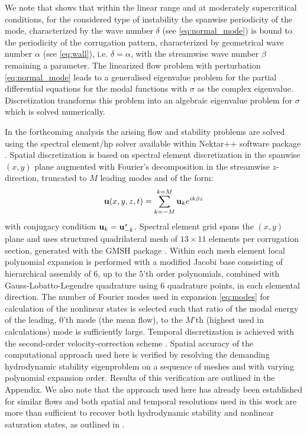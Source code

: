 \documentclass[lineno]{jfm}
\begin{document}
We note that \citet{Nikesh2017} shows that within the linear range and at moderately supercritical conditions, for the considered type of instability the spanwise
periodicity of the mode, characterized by the wave number $\delta$ (see \eqref{eq:normal_mode}) is bound to the periodicity of the corrugation pattern, characterized by geometrical wave number $\alpha$ (see \eqref{eq:wall}), i.e. $\delta=\alpha$, with the streamwise wave number $\beta$ remaining a parameter.
The linearized flow problem with perturbation \eqref{eq:normal_mode} leads to a generalised eigenvalue problem for the partial differential equations for the modal functions with $\sigma$ as the complex eigenvalue.
Discretization transforms this problem into an algebraic eigenvalue problem for $\sigma$
which is solved numerically.

In the forthcoming analysis the arising flow and stability problems are solved using the spectral element/hp solver available within Nektar++ software package \citep{Cantwell2015}.
Spatial discretization is based on spectral element discretization in the spanwise $(x,y)$ plane augmented with Fourier’s decomposition in the streamwise $z$-direction, truncated to $M$ leading modes and of the form:
\begin{equation}\label{eq:modes}
    \textbf{u}(x,y,z,t) =   \sum_{k=-M}^{k=M} {\bf u}_k e^{ik\beta z}
\end{equation}
with conjugacy condition {${\bf u}_k={\bf u}^*_{-k}$}.
Spectral element grid spans the $(x,y)$ plane and uses structured quadrilateral
mesh of $13\times11$ elements per corrugation section, generated with the GMSH package \citep{GMSH2009}.
Within each mesh element local polynomial expansion is performed with a modified Jacobi base \citep{Cantwell2011}
consisting of hierarchical assembly of
$6$, up to the $5$'th order polynomials,
combined with Gauss-Lobatto-Legendre quadrature using $6$ quadrature points, in each elemental direction.
The number of Fourier modes used in expansion \eqref{eq:modes} for calculation of the nonlinear states is selected such that ratio of the modal energy of the leading, $0$'th mode (the mean flow), to the $M$'th (highest used in calculations) mode is sufficiently large.
Temporal discretization is achieved with the second-order velocity-correction scheme \citep{Serson2016velocitycorrection}.
Spatial accuracy of the computational approach used here is verified by resolving the demanding hydrodynamic stability eigenproblem on a sequence of meshes and with varying polynomial expansion order. Results of this verification are outlined in the Appendix. We also note that the approach used here has already been established for similar flows \citep{gepner2016,Nikesh2017,Nikesh2018,Nikesh2021,Hossain2021spectral} and both spatial and temporal resolutions used in this work are more than sufficient to recover both hydrodynamic stability and nonlinear saturation states, as outlined in \cite{Nikesh2017}.
\end{document}
